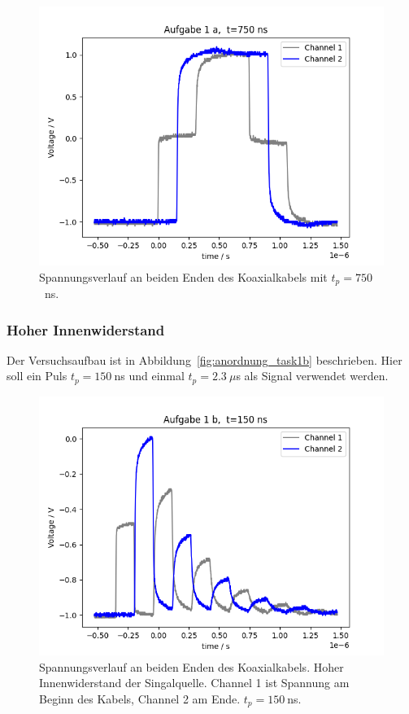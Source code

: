 \documentclass{article}
\begin{document}
\begin{figure}[H]
\centering
\caption{Spannungsverlauf an beiden Enden des Koaxialkabels mit $t_p=750$~ns.}
\label{fig:task1a_750ns}
\includegraphics[scale=0.6]{bilder/task1a/task1a_750ns.png}
\end{figure}





\subsubsection{Hoher Innenwiderstand}
Der Versuchsaufbau ist in Abbildung~\ref{fig:anordnung_task1b} beschrieben. Hier soll ein Puls $t_p = 150~$ns und einmal $t_p = 2.3~\mu$s  als Signal verwendet werden.


\begin{figure}[H]
\centering
\caption{Spannungsverlauf an beiden Enden des Koaxialkabels. Hoher Innenwiderstand der Singalquelle. Channel 1 ist Spannung am Beginn des Kabels, Channel 2 am Ende. $t_p = 150~$ns.}
\label{fig:task1b_150ns}
\includegraphics[scale=0.6]{bilder/task1b/task1b_150ns.png}
\end{figure}
\end{document}
